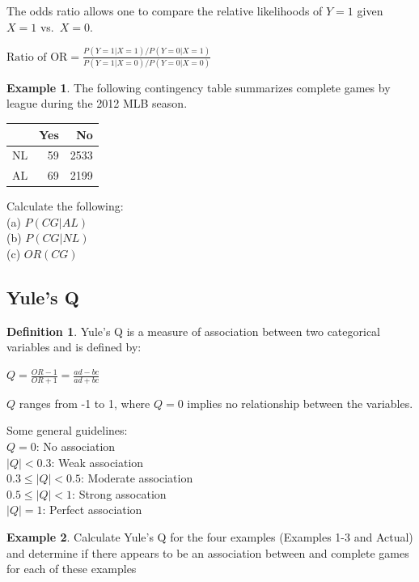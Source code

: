 \documentclass[
  11pt,
]{book}
\theoremstyle{definition}
\newtheorem{definition}{Definition}[chapter]
\theoremstyle{definition}
\newtheorem{example}{Example}[chapter]
\theoremstyle{definition}
\theoremstyle{definition}
\theoremstyle{remark}
\begin{document}
The odds ratio allows one to compare the relative likelihoods of \(Y=1\) given \(X=1\) vs.~\(X=0\).

\(\text{Ratio of OR} = \frac{P(Y=1|X=1)/P(Y=0|X=1)}{P(Y=1|X=0)/P(Y=0|X=0)}\)

\begin{example}
The following contingency table summarizes complete games by league during the 2012 MLB season.\\

\end{example}

\begin{tabular}{lrr}
\toprule
  & Yes & No\\
\midrule
NL & 59 & 2533\\
AL & 69 & 2199\\
\bottomrule
\end{tabular}

\bigskip

Calculate the following:\\
(a) \(P(CG|AL)\)\\
(b) \(P(CG|NL)\)\\
(c) \(OR(CG)\)\\

\vfill

\newpage

\hypertarget{yules-q}{%
\subsection{Yule's Q}\label{yules-q}}

\begin{definition}
Yule's Q is a measure of association between two categorical variables and is defined by:

\(Q = \frac{OR-1}{OR+1} = \frac{ad-bc}{ad+bc}\)

\(Q\) ranges from -1 to 1, where \(Q=0\) implies no relationship between the variables.

Some general guidelines:\\
\(Q=0\): No association\\
\(|Q| < 0.3\): Weak association\\
\(0.3 \leq |Q| < 0.5\): Moderate association\\
\(0.5 \leq |Q| < 1\): Strong assocation\\
\(|Q|=1\): Perfect association
\end{definition}

\begin{example}
Calculate Yule's Q for the four examples (Examples 1-3 and Actual) and determine if there appears to be an association between and complete games for each of these examples
\end{example}
\end{document}
